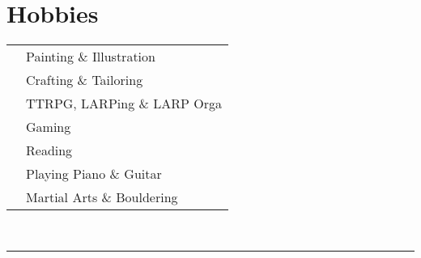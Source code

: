 \documentclass[oneside]{article}
\begin{document}
{\begin{minipage}[t][\dimexpr\textheight-2\fboxrule-2\fboxsep\relax][t]{\dimexpr0.4\textwidth-2\fboxrule-2\fboxsep\relax}
        \section*{\large Hobbies}
        \begin{tabularx}{\textwidth}{cY}
            \faPaintBrush{} & Painting \& Illustration \\
            \faPencilRuler{} & Crafting \& Tailoring \\
             & TTRPG, LARPing \& LARP Orga \\
            \faGamepad{} & Gaming \\
            \faBook{} & Reading \\
            \faGuitar{} & Playing Piano \& Guitar \\
            \faRunning{} & Martial Arts \& Bouldering \\
        \end{tabularx}
        \vspace{.3cm}
        \\
        \rule{\linewidth}{0.4pt}
    \end{minipage}%
}%
\end{document}
